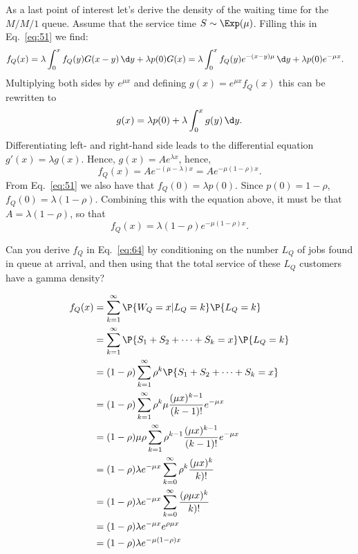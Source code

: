 As a last point of interest let's derive the density of the waiting
time for the $M/M/1$ queue. Assume that the service time
$S\sim \Exp(\mu)$. Filling this in Eq.~\cref{eq:51} we find:
\begin{align*}
f_Q(x) &= \lambda \int_0^x f_Q(y) G(x-y) \,\d y + \lambda p(0) G(x)
= \lambda \int_0^x f_Q(y) e^{-(x-y)\mu} \,\d y + \lambda p(0) e^{-\mu x}.
\end{align*}
Multiplying both sides by $e^{\mu x}$ and defining $g(x) =
e^{\mu x} f_Q(x)$ this can be rewritten to
\begin{equation*}
g(x) = \lambda p(0) + \lambda \int_0^x g(y) \,\d y.
\end{equation*}
Differentiating left- and right-hand side leads to the differential equation $g'(x) = \lambda g(x)$. Hence, $g(x) = A e^{\lambda x}$, hence,
\begin{equation*}
f_Q(x) = A e^{-(\mu-\lambda)x} = A e^{- \mu(1-\rho)x}.
\end{equation*}
From Eq.~\cref{eq:51} we also have that $f_Q(0) = \lambda
p(0)$.
Since $p(0)=1-\rho$, $f_Q(0) = \lambda (1-\rho)$. Combining this with
the equation above, it must be that $A=\lambda(1-\rho)$, so that
\begin{equation}\label{eq:64}
f_Q(x) = \lambda(1-\rho) e^{- \mu(1-\rho)x}.
\end{equation}


\begin{exercise}
 Can you derive $f_Q$ in Eq.~\cref{eq:64} by conditioning on the
 number $L_Q$ of jobs found in queue at arrival, and then using that
 the total service of these $L_Q$ customers have a gamma density?
\begin{solution}
\begin{align*}
f_Q(x)
&= \sum_{k=1}^\infty \P{W_Q = x | L_Q = k}\P{L_Q = k } \\
&= \sum_{k=1}^\infty \P{S_1 + S_2 + \cdots + S_k = x}\P{L_Q = k } \\
&= (1-\rho) \sum_{k=1}^\infty \rho^k \P{S_1 + S_2 + \cdots + S_k = x } \\
&= (1-\rho) \sum_{k=1}^\infty \rho^k \mu \frac{(\mu x)^{k-1}}{(k-1)!}e^{-\mu x}\\
&= (1-\rho) \mu \rho \sum_{k=1}^\infty \rho^{k-1} \frac{(\mu x)^{k-1}}{(k-1)!}e^{-\mu x}\\
&= (1-\rho) \lambda e^{-\mu x}\sum_{k=0}^\infty \rho^{k} \frac{(\mu x)^{k}}{k)!}\\
&= (1-\rho) \lambda e^{-\mu x}\sum_{k=0}^\infty \frac{(\rho \mu x)^{k}}{k)!}\\
&= (1-\rho) \lambda e^{-\mu x} e^{\rho \mu x}\\
&= (1-\rho) \lambda e^{-\mu (1-\rho)x}
\end{align*}
\end{solution}
 \end{exercise}
 
